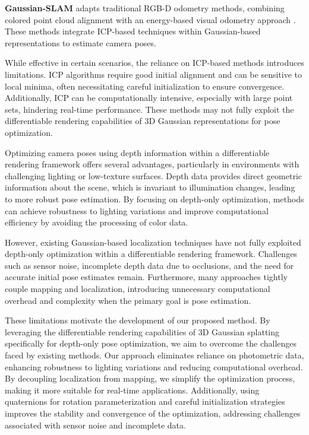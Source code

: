 \documentclass[twocolumn]{article}
\begin{document}
\textbf{Gaussian-SLAM}
\autocite{yugayGaussianSLAMPhotorealisticDense2024} adapts traditional
RGB-D odometry methods, combining colored point cloud alignment
\autocite{parkColoredPointCloud2017} with an energy-based visual
odometry approach \autocite{steinbruckerRealtimeVisualOdometry2011}.
These methods integrate ICP-based techniques within Gaussian-based
representations to estimate camera poses.

While effective in certain scenarios, the reliance on ICP-based methods
introduces limitations\autocite{pomerleauComparingICPVariants2013}. ICP
algorithms require good initial alignment and can be sensitive to local
minima, often necessitating careful initialization to ensure
convergence. Additionally, ICP can be computationally intensive,
especially with large point sets, hindering real-time performance. These
methods may not fully exploit the differentiable rendering capabilities
of 3D Gaussian representations for pose optimization.

Optimizing camera poses using depth information within a differentiable
rendering framework offers several advantages, particularly in
environments with challenging lighting or low-texture surfaces. Depth
data provides direct geometric information about the scene, which is
invariant to illumination changes, leading to more robust pose
estimation. By focusing on depth-only optimization, methods can achieve
robustness to lighting variations and improve computational efficiency
by avoiding the processing of color data.

However, existing Gaussian-based localization techniques have not fully
exploited depth-only optimization within a differentiable rendering
framework. Challenges such as sensor noise, incomplete depth data due to
occlusions, and the need for accurate initial pose estimates remain.
Furthermore, many approaches tightly couple mapping and localization,
introducing unnecessary computational overhead and complexity when the
primary goal is pose estimation.

These limitations motivate the development of our proposed method. By
leveraging the differentiable rendering capabilities of 3D Gaussian
splatting specifically for depth-only pose optimization, we aim to
overcome the challenges faced by existing methods. Our approach
eliminates reliance on photometric data, enhancing robustness to
lighting variations and reducing computational overhead. By decoupling
localization from mapping, we simplify the optimization process, making
it more suitable for real-time applications. Additionally, using
quaternions for rotation parameterization
\autocite{kuipersQuaternionsRotationSequences1999} and careful
initialization strategies improves the stability and convergence of the
optimization, addressing challenges associated with sensor noise and
incomplete data.
\end{document}
